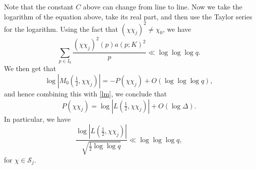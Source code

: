 \documentclass[12pt, reqno]{amsart}
\numberwithin{equation}{section}
\numberwithin{theorem}{section}
\numberwithin{equation}{section}
\begin{document}
Note that the constant $C$ above can change from line to line. Now we take the logarithm of the equation above, take its real part, and then use the Taylor series for the logarithm. Using the fact that $(\chi \chi_j)^2 \neq \chi_0$, we have
$$ \sum_{p \in I_0} \frac{ (\chi \chi_j)^2(p) a(p;K)^2}{p} \ll \log \log \log q.$$
We then get that
$$ \log |  M_0(  \tfrac{1}{2},\chi \chi_j)|  = - P(\chi \chi_j)+ O ( \log \log \log q ),$$ and hence combining this with \eqref{lm}, we conclude that 
\begin{equation} \label{eq:clean}
P(\chi\chi_j)=\log |L(\tfrac12,\chi\chi_j)|+O(\log\Delta).
\end{equation}
In particular, we have
\begin{equation} \label{eq:lfbound}
\frac{\log |L(\tfrac12,\chi\chi_j)| }{\sqrt{\frac12 \log \log q}}\ll \log \log \log q,
\end{equation}
 for $\chi \in \mathcal {S}_j$.
\end{document}
